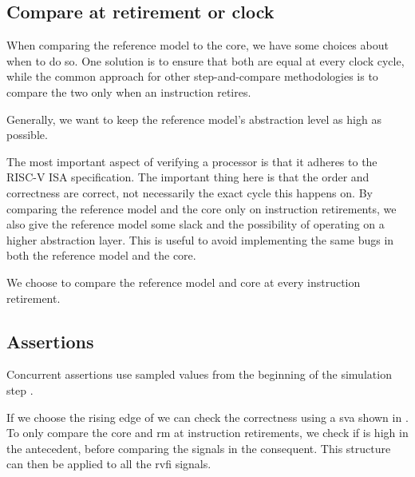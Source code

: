 \subsection{Compare at retirement or clock}
\label{sec:des_retireOrClock}

When comparing the reference model to the core, we have some choices about when to do so. One solution is to ensure that both are equal at every clock cycle, while the common approach for other step-and-compare methodologies is to compare the two only when an instruction retires.

Generally, we want to keep the reference model's abstraction level as high as possible. 

The most important aspect of verifying a processor is that it adheres to the RISC-V ISA specification\cite{}. The important thing here is that the order and correctness are correct, not necessarily the exact cycle this happens on. By comparing the reference model and the core only on instruction retirements, we also give the reference model some slack and the possibility of operating on a higher abstraction layer. This is useful to avoid implementing the same bugs in both the reference model and the core.

We choose to compare the reference model and core at every instruction retirement.

\subsection{Assertions}

Concurrent assertions use sampled values from the beginning of the simulation step \cite[Section~4.4.3]{cernySVAPowerAssertions2015}. 

If we choose the rising edge of  we can check the correctness using a \acrshort{sva} shown in . To only compare the core and \acrshort{rm} at instruction retirements, we check if  is high in the antecedent, before comparing the  signals in the consequent. This structure can then be applied to all the \acrshort{rvfi} signals.

